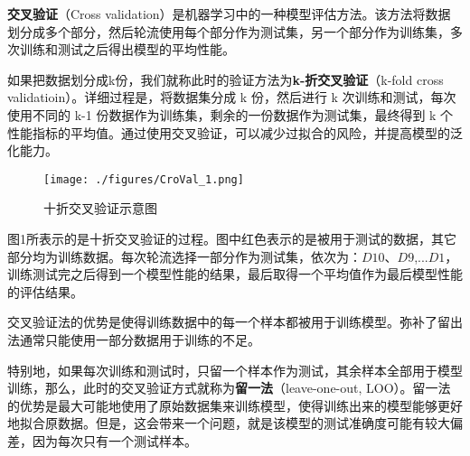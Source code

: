 
\textbf{交叉验证}（Cross validation）是机器学习中的一种模型评估方法。该方法将数据划分成多个部分，然后轮流使用每个部分作为测试集，另一个部分作为训练集，多次训练和测试之后得出模型的平均性能。

如果把数据划分成k份，我们就称此时的验证方法为\textbf{k-折交叉验证}（k-fold cross validatioin）。详细过程是，将数据集分成 k 份，然后进行 k 次训练和测试，每次使用不同的 k-1 份数据作为训练集，剩余的一份数据作为测试集，最终得到 k 个性能指标的平均值。通过使用交叉验证，可以减少过拟合的风险，并提高模型的泛化能力。

\begin{figure}[ht]
\centering
\texttt{[image: ./figures/CroVal\_1.png]}
\caption{十折交叉验证示意图} \label{CroVal_fig1}
\end{figure}
图1所表示的是十折交叉验证的过程。图中红色表示的是被用于测试的数据，其它部分均为训练数据。每次轮流选择一部分作为测试集，依次为：$D10$、$D9$,...$D1$，训练测试完之后得到一个模型性能的结果，最后取得一个平均值作为最后模型性能的评估结果。

交叉验证法的优势是使得训练数据中的每一个样本都被用于训练模型。弥补了留出法通常只能使用一部分数据用于训练的不足。

特别地，如果每次训练和测试时，只留一个样本作为测试，其余样本全部用于模型训练，那么，此时的交叉验证方式就称为\textbf{留一法}（leave-one-out, LOO）。留一法的优势是最大可能地使用了原始数据集来训练模型，使得训练出来的模型能够更好地拟合原数据。但是，这会带来一个问题，就是该模型的测试准确度可能有较大偏差，因为每次只有一个测试样本。